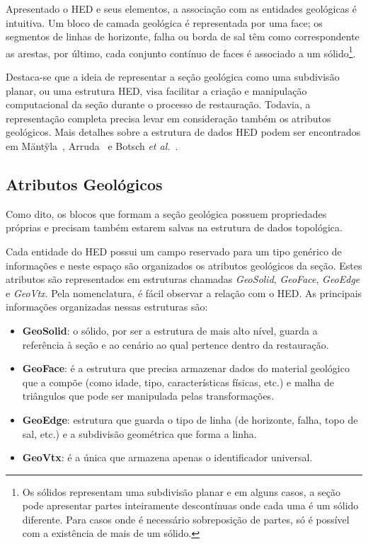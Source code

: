 Apresentado o HED e seus elementos, a associação com as entidades geológicas é intuitiva. Um bloco de camada geológica é representada por uma face; os segmentos de linhas de horizonte, falha ou borda de sal têm como correspondente as arestas, por último, cada conjunto contínuo de faces é associado a um sólido\footnote{Os sólidos representam uma subdivisão planar e em alguns casos, a seção pode apresentar partes inteiramente descontínuas onde cada uma é um sólido diferente. Para casos onde é necessário sobreposição de partes, só é possível com a existência de mais de um sólido.}.

Destaca-se que a ideia de representar a seção geológica como uma subdivisão planar, ou uma estrutura HED, visa facilitar a criação e manipulação computacional da seção durante o processo de restauração. Todavia, a representação completa precisa levar em consideração também os atributos geológicos. Mais detalhes sobre a estrutura de dados HED podem ser encontrados em Mäntÿla~\cite{HED}, Arruda~\cite{Arruda} e Botsch \textit{et al.}~\cite{Botsch}.

\subsection{Atributos Geológicos}

Como dito, os blocos que formam a seção geológica possuem propriedades próprias e precisam também estarem salvas na estrutura de dados topológica.

Cada entidade do HED possui um campo reservado para um tipo genérico de informações e neste espaço são organizados os atributos geológicos da seção. Estes atributos são representados em estruturas chamadas \textit{GeoSolid}, \textit{GeoFace}, \textit{GeoEdge} e \textit{GeoVtx}. Pela nomenclatura, é fácil observar a relação com o HED. As principais informações organizadas nessas estruturas são:

\renewcommand{\labelitemi}{•}
\begin{itemize}
  \item \textbf{GeoSolid}: o sólido, por ser a estrutura de mais alto nível, guarda a referência à seção e ao cenário ao qual pertence dentro da restauração.
  \item \textbf{GeoFace}: é a estrutura que precisa armazenar dados do material geológico que a compõe (como idade, tipo, características físicas, etc.) e malha de triângulos que pode ser manipulada pelas transformações.
  \item \textbf{GeoEdge}: estrutura que guarda o tipo de linha (de horizonte, falha, topo de sal, etc.) e a subdivisão geométrica que forma a linha. 
  \item \textbf{GeoVtx}: é a única que armazena apenas o identificador universal.
\end{itemize}

